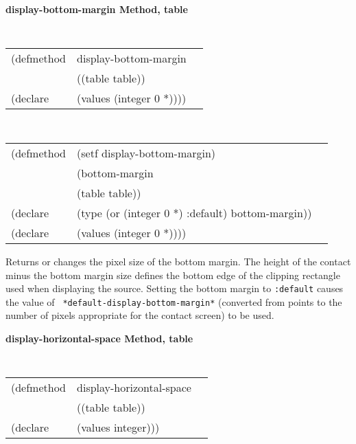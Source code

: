 {\samepage
{\large {\bf display-bottom-margin \hfill Method, table}}
\begin{flushright} \parbox[t]{6.125in}{
\tt
\begin{tabular}{lll}
\raggedright
(defmethod & display-bottom-margin & \\
& ((table  table)) \\
(declare & (values (integer 0 *))))
\end{tabular}
\rm}\end{flushright}}

\begin{flushright} \parbox[t]{6.125in}{
\tt
\begin{tabular}{lll}
\raggedright
(defmethod & (setf display-bottom-margin) & \\
& (bottom-margin \\
& (table  table)) \\
(declare &(type (or (integer 0 *) :default)  bottom-margin))\\
(declare & (values (integer 0 *))))
\end{tabular}
\rm}\end{flushright}

\begin{flushright} \parbox[t]{6.125in}{ 
Returns or changes the pixel size of the
bottom margin.  The height of the contact minus the bottom margin size defines
the bottom edge of the clipping rectangle used when displaying the source.
Setting the bottom margin to {\tt :default} causes the value of {\tt
*default-display-bottom-margin*} (converted from points to the number of pixels
appropriate for the contact screen) to be used.
  
}\end{flushright}


{\samepage
{\large {\bf display-horizontal-space \hfill Method, table}}
\begin{flushright} \parbox[t]{6.125in}{
\tt
\begin{tabular}{lll}
\raggedright
(defmethod & display-horizontal-space & \\
& ((table  table)) \\
(declare & (values integer)))
\end{tabular}
\rm}\end{flushright}}

